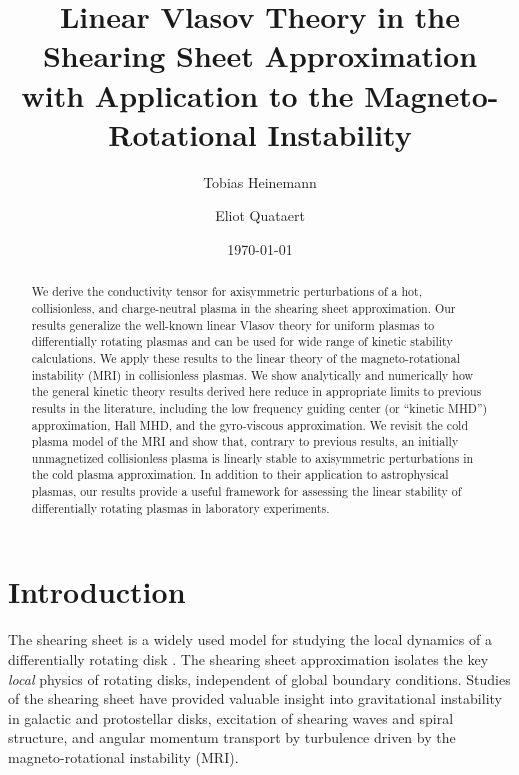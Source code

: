 \documentclass[aps,pre,notitlepage,amsmath,amssymb,amsfonts,nobibnotes,nofootinbib]{revtex4-1}
\begin{document}
\title{Linear Vlasov Theory in the Shearing Sheet Approximation \\
  with Application to the Magneto-Rotational Instability}

\author{Tobias Heinemann}
\author{Eliot Quataert}

\date{\today}

\begin{abstract}

We derive the conductivity tensor for axisymmetric perturbations of a hot,
collisionless, and charge-neutral plasma in the shearing sheet approximation.
Our results generalize the well-known linear Vlasov theory for uniform plasmas
to differentially rotating plasmas and can be used for wide range of kinetic
stability calculations. We apply these results to the linear theory of the
magneto-rotational instability (MRI) in collisionless plasmas. We show
analytically and numerically how the general kinetic theory results derived
here reduce in appropriate limits to previous results in the literature,
including the low frequency guiding center (or ``kinetic MHD'') approximation,
Hall MHD, and the gyro-viscous approximation. We revisit the cold plasma model
of the MRI and show that, contrary to previous results, an initially
unmagnetized collisionless plasma is linearly stable to axisymmetric
perturbations in the cold plasma approximation. In addition to their
application to astrophysical plasmas, our results provide a useful framework
for assessing the linear stability of differentially rotating plasmas in
laboratory experiments.

\end{abstract}

\maketitle

\section{Introduction}

The shearing sheet is a widely used model for studying the local dynamics of a
differentially rotating disk
\citep[e.g.][]{Hill1878,Goldreich1965,Hawley1996}. The shearing sheet
approximation isolates the key \emph{local} physics of rotating disks,
independent of global boundary conditions. Studies of the shearing sheet have
provided valuable insight into gravitational instability in galactic and
protostellar disks, excitation of shearing waves and spiral structure, and
angular momentum transport by turbulence driven by the magneto-rotational
instability (MRI).
\end{document}

